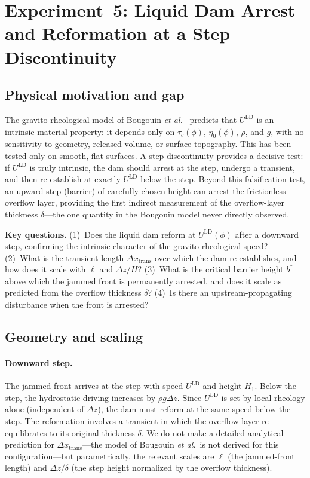 \documentclass[aps,preprint,superscriptaddress,longbibliography]{revtex4-2}
\newcommand{\ULD}{{U^{\mathrm{LD}}}}
\newcommand{\tauc}{\tau_c}
\newcommand{\etaz}{\eta_0}
\begin{document}
\section{Experiment~5: Liquid Dam Arrest and Reformation at a Step Discontinuity}
\label{sec:step}

\subsection{Physical motivation and gap}

The gravito-rheological model of Bougouin \textit{et al.}~\cite{Bougouin2026PRL}
predicts that $\ULD$ is an intrinsic material property: it depends only on
$\tauc(\phi)$, $\etaz(\phi)$, $\rho$, and $g$, with no sensitivity to geometry,
released volume, or surface topography.  This has been tested only on smooth,
flat surfaces.  A step discontinuity provides a decisive test: if $\ULD$ is
truly intrinsic, the dam should arrest at the step, undergo a transient, and
then re-establish at exactly $\ULD$ below the step.  Beyond this falsification
test, an upward step (barrier) of carefully chosen height can arrest the
frictionless overflow layer, providing the first indirect measurement of the
overflow-layer thickness $\delta$---the one quantity in the Bougouin model never
directly observed.

\begin{mdframed}[style=questionbox]
\textbf{Key questions.}
(1)~Does the liquid dam reform at $\ULD(\phi)$ after a downward step, confirming
the intrinsic character of the gravito-rheological speed?
(2)~What is the transient length $\Delta x_\text{trans}$ over which the dam
re-establishes, and how does it scale with $\ell$ and $\Delta z/H$?
(3)~What is the critical barrier height $b^*$ above which the jammed front
is permanently arrested, and does it scale as predicted from the overflow
thickness $\delta$?
(4)~Is there an upstream-propagating disturbance when the front is arrested?
\end{mdframed}

\subsection{Geometry and scaling}

\paragraph{Downward step.}
The jammed front arrives at the step with speed $\ULD$ and height $H_1$.
Below the step, the hydrostatic driving increases by $\rho g\Delta z$.  Since
$\ULD$ is set by local rheology alone (independent of $\Delta z$), the dam must
reform at the same speed below the step.  The reformation involves a transient
in which the overflow layer re-equilibrates to its original thickness $\delta$.
We do not make a detailed analytical prediction for $\Delta x_\text{trans}$---the
model of Bougouin \textit{et al.}\ is not derived for this configuration---but
parametrically, the relevant scales are $\ell$ (the jammed-front length) and
$\Delta z/\delta$ (the step height normalized by the overflow thickness).
\end{document}
